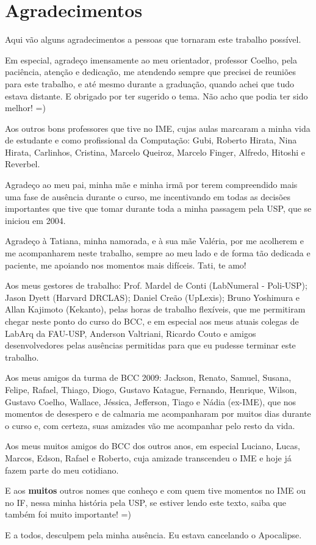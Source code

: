 
\newpage
\section*{Agradecimentos}

Aqui vão alguns agradecimentos a pessoas que tornaram este trabalho possível.

Em especial, agradeço imensamente ao meu orientador, professor Coelho, pela paciência,
atenção e dedicação, me atendendo sempre que precisei de reuniões para este trabalho, e
até mesmo durante a graduação, quando achei que tudo estava distante. E obrigado por
ter sugerido o tema. Não acho que podia ter sido melhor! =)

Aos outros bons professores que tive no IME, cujas aulas marcaram a minha vida de
estudante e como profissional da Computação: Gubi, Roberto Hirata, Nina Hirata,
Carlinhos, Cristina, Ḿarcelo Queiroz, Marcelo Finger, Alfredo, Hitoshi e Reverbel.

Agradeço ao meu pai, minha mãe e minha irmã por terem compreendido mais uma fase de
ausência durante o curso, me incentivando em todas as decisões importantes que tive que
tomar durante toda a minha passagem pela USP, que se iniciou em 2004.

Agradeço à Tatiana, minha namorada, e à sua mãe Valéria, por me acolherem e me
acompanharem neste trabalho, sempre ao meu lado e de forma tão dedicada e paciente, me
apoiando nos momentos mais difíceis. Tati, te amo!

Aos meus gestores de trabalho: Prof. Mardel de Conti (LabNumeral - Poli-USP); Jason
Dyett (Harvard DRCLAS); Daniel Creão (UpLexis); Bruno Yoshimura e Allan Kajimoto
(Kekanto), pelas horas de trabalho flexíveis, que me permitiram chegar neste ponto do
curso do BCC, e em especial aos meus atuais colegas de LabArq da FAU-USP, Anderson
Valtriani, Ricardo Couto e amigos desenvolvedores pelas ausências permitidas para que
eu pudesse terminar este trabalho.

Aos meus amigos da turma de BCC 2009: Jackson, Renato, Samuel, Susana, Felipe, Rafael,
Thiago, Diogo, Gustavo Katague, Fernando, Henrique, Wilson, Gustavo Coelho, Wallace,
Jéssica, Jefferson, Tiago e Nádia (ex-IME), que nos momentos de desespero e de calmaria
me acompanharam por muitos dias durante o curso e, com certeza, suas amizades vão me
acompanhar pelo resto da vida.

Aos meus muitos amigos do BCC dos outros anos, em especial Luciano, Lucas, Marcos,
Edson, Rafael e Roberto, cuja amizade transcendeu o IME e hoje já fazem parte do meu
cotidiano.

E aos \textbf{muitos} outros nomes que conheço e com quem tive momentos no IME ou no
IF, nessa minha história pela USP, se estiver lendo este texto, saiba que também foi
muito importante! =)

E a todos, desculpem pela minha ausência. Eu estava cancelando o Apocalipse.

\afterpage{\clearpage}
